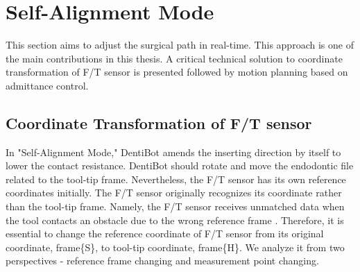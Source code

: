 \section{Self-Alignment Mode}
\hspace*{6mm}This section aims to adjust the surgical path in real-time. This approach is one of the main contributions in this thesis. A critical technical solution to coordinate transformation of F/T sensor is presented followed by motion planning based on admittance control. 
\subsection*{Coordinate Transformation of F/T sensor}
\label{sec:rfc}
\vspace*{-5mm}
\hspace*{6mm}In "Self-Alignment Mode," DentiBot amends the inserting direction by itself to lower the contact resistance. DentiBot should rotate and move the endodontic file related to the tool-tip frame. Nevertheless, the F/T sensor has its own reference coordinates initially. The F/T sensor originally recognizes its coordinate rather than the tool-tip frame. Namely, the F/T sensor receives unmatched data when the tool contacts an obstacle due to the wrong reference frame \cite{erdogan2014gravity}. Therefore, it is essential to change the reference coordinate of F/T sensor from its original coordinate, frame\{S\}, to tool-tip coordinate, frame\{H\}. We analyze it from two perspectives - reference frame changing and measurement point changing.
